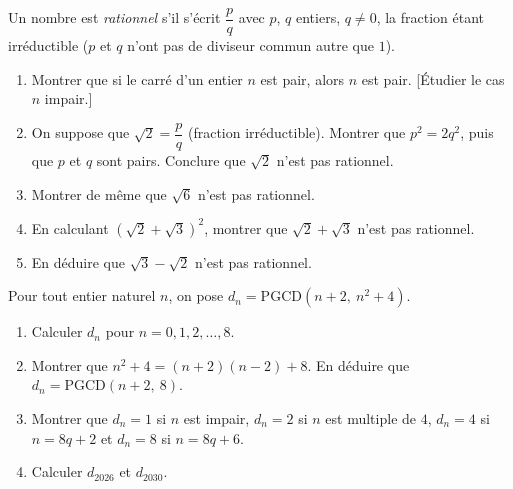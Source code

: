 \documentclass[12pt,a4paper]{article}
\begin{document}
\begin{exo}[title={Racines irrationnelles}, stars=4]
Un nombre est \emph{rationnel} s'il s'écrit $\dfrac pq$ avec $p$, $q$ entiers, $q\neq0$, la fraction étant irréductible ($p$ et $q$ n'ont pas de diviseur commun autre que $1$).
\begin{enumerate}
  \item Montrer que si le carré d'un entier $n$ est pair, alors $n$ est pair. [Étudier le cas $n$ impair.]
  \item On suppose que $\sqrt2=\dfrac pq$ (fraction irréductible). Montrer que $p^2=2q^2$, puis que $p$ et $q$ sont pairs. Conclure que $\sqrt2$ n'est pas rationnel.
  \item Montrer de même que $\sqrt6$ n'est pas rationnel.
  \item En calculant $(\sqrt2+\sqrt3)^2$, montrer que $\sqrt2+\sqrt3$ n'est pas rationnel.
  \item En déduire que $\sqrt3-\sqrt2$ n'est pas rationnel.
\end{enumerate}
\end{exo}

\begin{exo}[title={PGCD et divisibilité par 2, 4, 8}, stars=4]
Pour tout entier naturel $n$, on pose $d_n=\mathrm{PGCD}(n+2,\ n^2+4)$.
\begin{enumerate}
  \item Calculer $d_n$ pour $n=0,1,2,\dots,8$.
  \item Montrer que $n^2+4=(n+2)(n-2)+8$. En déduire que $d_n=\mathrm{PGCD}(n+2,\ 8)$.
  \item Montrer que $d_n=1$ si $n$ est impair, $d_n=2$ si $n$ est multiple de $4$, $d_n=4$ si $n=8q+2$ et $d_n=8$ si $n=8q+6$.
  \item Calculer $d_{2026}$ et $d_{2030}$.
\end{enumerate}
\end{exo}
\end{document}

